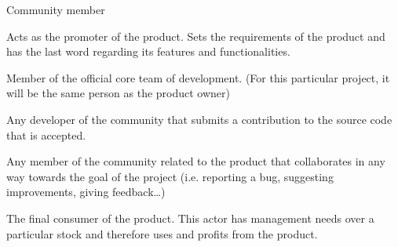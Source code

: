 \begin{labeling}{Community member}
\item[\textbf{Product owner}]{Acts as the promoter of the product. Sets the requirements of the product and has the last word regarding its features and functionalities.}
\item[\textbf{Developer}]{Member of the official core team of development. (For this particular project, it will be the same person as the product owner)}
\item[\textbf{Contributor}]{Any developer of the community that submits a contribution to the source code that is accepted.}
\item[\textbf{Community member}]{Any member of the community related to the product that collaborates in any way towards the goal of the project (i.e. reporting a bug, suggesting improvements, giving feedback…)}
\item[\textbf{User}]{The final consumer of the product. This actor has management needs over a particular stock and therefore uses and profits from the product.}
\end{labeling}